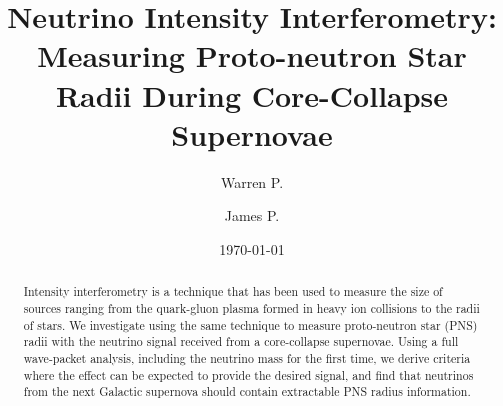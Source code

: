 \documentclass[aps,prl,reprint,floatfix
]{revtex4-1}
\begin{document}
\title{Neutrino Intensity Interferometry:\texorpdfstring{\\}{}Measuring Proto-neutron Star Radii During Core-Collapse Supernovae}

\author{Warren P. }

\author{James P. }
\date{\today}

\begin{abstract}
Intensity interferometry is a technique that has been used to measure the size of sources ranging from the quark-gluon plasma formed in heavy ion collisions to the radii of stars. We investigate using the same technique to measure proto-neutron star (PNS) radii with the neutrino signal received from a core-collapse supernovae. Using a full wave-packet analysis, including the neutrino mass for the first time, we derive criteria where the effect can be expected to provide the desired signal, and find that neutrinos from the next Galactic supernova should contain extractable PNS radius information.
\end{abstract}

\maketitle
\end{document}
